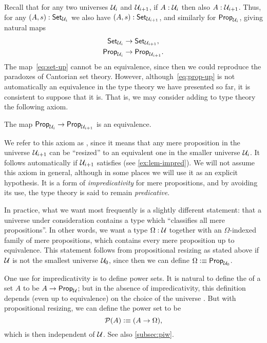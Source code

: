 Recall that for any two universes $\mathcal{U}_i$ and $\mathcal{U}_{i+1}$, if $A:\mathcal{U}_i$ then also $A:\mathcal{U}_{i+1}$.
Thus, for any $(A,s):\mathsf{Set}_{\mathcal{U}_i}$ we also have $(A,s):\mathsf{Set}_{\mathcal{U}_{i+1}}$, and similarly for $\mathsf{Prop}_{\mathcal{U}_i}$, giving natural maps
\begin{align}
  \set_{\UU_i} &\to \set_{\UU_{i+1}}\label{eq:set-up},\\
  \prop_{\UU_i} &\to \prop_{\UU_{i+1}}.\label{eq:prop-up}
\end{align}
The map~\eqref{eq:set-up} cannot be an equivalence, since then we could reproduce the paradoxes of Cantorian set theory.
However, although~\eqref{eq:prop-up} is not automatically an equivalence in the type theory we have presented so far, it is consistent to suppose that it is.
That is, we may consider adding to type theory the following axiom.

\begin{axiom}
  The map $\mathsf{Prop}_{\mathcal{U}_i} \to \mathsf{Prop}_{\mathcal{U}_{i+1}}$ is an equivalence.
\end{axiom}

We refer to this axiom as ,
since it means that any mere proposition in the universe $\mathcal{U}_{i+1}$ can be ``resized'' to an equivalent one in the smaller universe $\mathcal{U}_i$.
It follows automatically if $\mathcal{U}_{i+1}$ satisfies \LEM{} (see \autoref{ex:lem-impred}).
We will not assume this axiom in general, although in some places we will use it as an explicit hypothesis.
It is a form of \emph{impredicativity} for mere propositions, and by avoiding its use, the type theory is said to remain \emph{predicative}.
%
%

In practice, what we want most frequently is a slightly different statement: that a universe \UU under consideration contains a type which ``classifies all mere propositions''.
In other words, we want a type $\Omega:\mathcal{U}$ together with an $\Omega$-indexed family of mere propositions, which contains every mere proposition up to equivalence.
This statement follows from propositional resizing as stated above if $\mathcal{U}$ is not the smallest universe $\mathcal{U}_0$, since then we can define $\Omega\vcentcolon\equiv \mathsf{Prop}_{\mathcal{U}_0}$.

One use for impredicativity is to define power sets.
It is natural to define the  of a set $A$ to be $A\to\mathsf{Prop}_\mathcal{U}$; but in the absence of impredicativity, this definition depends
(even up to equivalence) on the choice of the universe \UU.
But with propositional resizing, we can define the power set to be
%
\[ \mathcal{P}(A) \vcentcolon\equiv (A\to\Omega),\]
which is then independent of $\mathcal{U}$.
See also \autoref{subsec:piw}.


